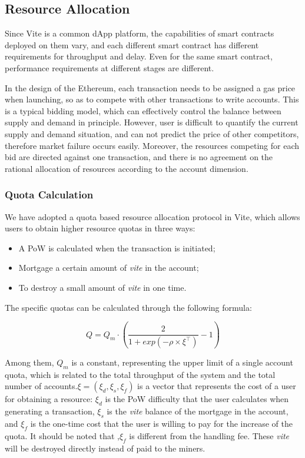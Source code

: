 \documentclass[UTF8,nofonts]{article}
\begin{document}
\begin{multicols}{2}
\subsection{Resource Allocation}
Since Vite is a common dApp platform, the capabilities of smart contracts deployed on them vary, and each different smart contract has different requirements for throughput and delay. Even for the same smart contract, performance requirements at different stages are different.

In the design of the Ethereum, each transaction needs to be assigned a gas price when launching, so as to compete with other transactions to write accounts. This is a typical bidding model, which can effectively control the balance between supply and demand in principle. However, user is difficult to quantify the current supply and demand situation, and can not predict the price of other competitors, therefore market failure occurs easily. Moreover, the resources competing for each bid are directed against one transaction, and there is no agreement on the rational allocation of resources according to the account dimension.

\subsubsection{Quota Calculation}
We have adopted a quota based resource allocation protocol in Vite, which allows users to obtain higher resource quotas in three ways:
\begin{itemize}
\item A PoW is calculated when the transaction is initiated;
\item Mortgage a certain amount of \textit{vite} in the account;
\item To destroy a small amount of \textit{vite} in one time.
\end{itemize}

The specific quotas can be calculated through the following formula:

\begin{equation}
Q = Q_{m} \cdot \left ( \frac{2}{1+exp\left ( -\rho \times \xi^{\top} \right )} - 1  \right )
\end{equation}

Among them, $Q_{m}$ is a constant, representing the upper limit of a single account quota, which is related to the total throughput of the system and the total number of accounts.$\xi=(\xi_{d}, \xi_{s}, \xi_{f})$ is a vector that represents the cost of a user for obtaining a resource: $\xi_{d}$ is the PoW difficulty that the user calculates when generating a transaction, $\xi_{s}$ is the \textit{vite} balance of the mortgage in the account, and $\xi_{f}$ is the one-time cost that the user is willing to pay for the increase of the quota. It should be noted that ,$\xi_{f}$ is different from the handling fee. These \textit{vite} will be destroyed directly instead of paid to the miners.


\end{multicols}
\end{document}
